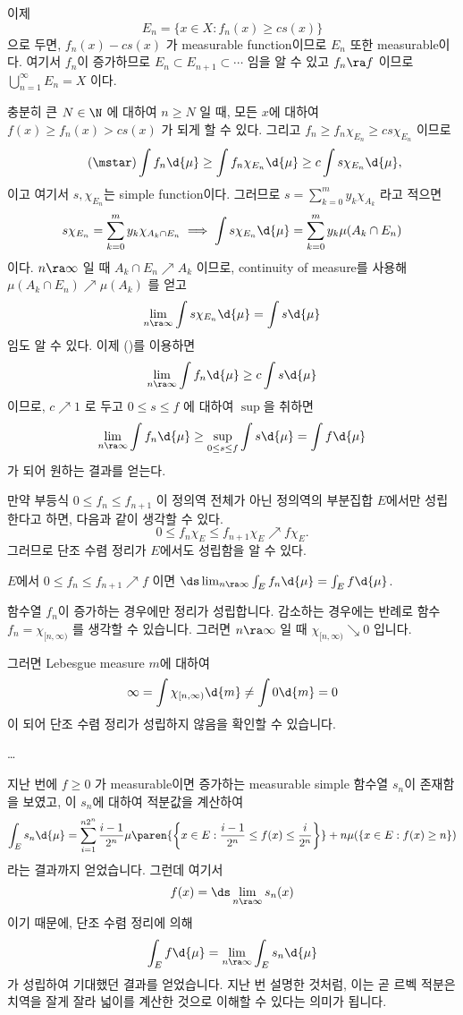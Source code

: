 이제
\[
    E_n = \{x \in X : f_n(x) \geq cs(x)\}
\]
으로 두면, \(f_n(x) - cs(x)\) 가 measurable function이므로 \(E_n\) 또한 measurable이다. 여기서 \(f_n\)이 증가하므로 \(E_n\subset E_{n+1} \subset \cdots\) 임을 알 수 있고 \(f_n \ra f\) 이므로 \(\bigcup_{n=1}^\infty E_n = X\) 이다.

충분히 큰 \(N \in \N\) 에 대하여 \(n \geq N\) 일 때, 모든 \(x\)에 대하여 \(f(x) \geq f_n(x) > cs(x)\) 가 되게 할 수 있다. 그리고 \(f_n \geq f_n \chi_{E_n} \geq cs \chi_{E_n}\) 이므로
\[ \tag{\mstar}
    \int f_n \d{\mu} \geq \int f_n \chi_{E_n} \d{\mu} \geq c\int s \chi_{E_n} \d{\mu},
\]
이고 여기서 \(s, \chi_{E_n}\)는 simple function이다. 그러므로 \(s = \sum_{k=0}^m y_k \chi_{A_k}\) 라고 적으면
\[
    s\chi_{E_n} = \sum_{k=0}^m y_k \chi_{A_k\cap E_n} \implies \int s \chi_{E_n} \d{\mu} = \sum_{k=0}^m y_k \mu(A_k\cap E_n)
\]
이다. \(n\ra\infty\) 일 때 \(A_k\cap E_n \nearrow A_k\) 이므로, continuity of measure를 사용해 \(\mu(A_k \cap E_n) \nearrow \mu(A_k)\) 를 얻고
\[
    \lim_{n\ra\infty} \int s \chi_{E_n}\d{\mu} = \int s \d{\mu}
\]
임도 알 수 있다. 이제 (\mstar)를 이용하면
\[
    \lim_{n\ra\infty} \int f_n \d{\mu} \geq c\int s \d{\mu}
\]
이므로, \(c \nearrow 1\) 로 두고 \(0\leq s\leq f\) 에 대하여 \(\sup\)을 취하면
\[
    \lim_{n\ra\infty} \int f_n \d{\mu} \geq \sup_{0\leq s\leq f} \int s \d{\mu} = \int f \d{\mu}
\]
가 되어 원하는 결과를 얻는다.

\rmk 만약 부등식 \(0 \leq f_n \leq f_{n+1}\) 이 정의역 전체가 아닌 정의역의 부분집합 \(E\)에서만 성립한다고 하면, 다음과 같이 생각할 수 있다.
\[
    0 \leq f_n \chi_E \leq f_{n+1} \chi_E \nearrow f \chi_E.
\]
그러므로 단조 수렴 정리가 \(E\)에서도 성립함을 알 수 있다.
\begin{center}
    \(E\)에서 \(0\leq f_n \leq f_{n+1} \nearrow f\) 이면 \(\ds \lim_{n\ra\infty} \int_E f_n \d{\mu} = \int_E f \d{\mu}\).
\end{center}

\rmk 함수열 \(f_n\)이 증가하는 경우에만 정리가 성립합니다. 감소하는 경우에는 반례로 함수 \(f_n = \chi_{[n, \infty)}\) 를 생각할 수 있습니다. 그러면 \(n \ra \infty\) 일 때 \(\chi_{[n, \infty)} \searrow 0\) 입니다.

그러면 Lebesgue measure \(m\)에 대하여
\[
    \infty = \int \chi_{[n, \infty)} \d{m} \neq \int 0 \d{m} = 0
\]
이 되어 단조 수렴 정리가 성립하지 않음을 확인할 수 있습니다.

\dots

지난 번에 \(f \geq 0\) 가 measurable이면 증가하는 measurable simple 함수열 \(s_n\)이 존재함을 보였고, 이 \(s_n\)에 대하여 적분값을 계산하여
\[
    \int_E s_n \d{\mu} = \sum_{i=1}^{n2^n} \frac{i - 1}{2^n}\mu\paren{\left\{x \in E : \frac{i-1}{2^n} \leq f(x) \leq \frac{i}{2^n}\right\}} + n\mu(\{x \in E : f(x)\geq n\})
\]
라는 결과까지 얻었습니다. 그런데 여기서
\[
    f(x) = \ds \lim_{n\ra\infty} s_n(x)
\]
이기 때문에, 단조 수렴 정리에 의해
\[
    \int_E f \d{\mu} = \lim_{n\ra\infty} \int_E s_n \d{\mu}
\]
가 성립하여 기대했던 결과를 얻었습니다. 지난 번 설명한 것처럼, 이는 곧 르벡 적분은 치역을 잘게 잘라 넓이를 계산한 것으로 이해할 수 있다는 의미가 됩니다.

